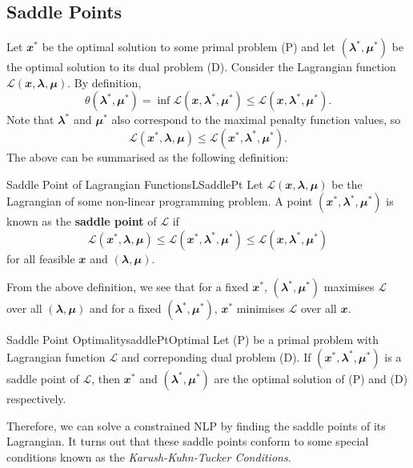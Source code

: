 \documentclass[math, code]{amznotes}
\theoremstyle{remark}
\begin{document}
\subsection{Saddle Points}
Let $\mathbfit{x}^*$ be the optimal solution to some primal problem (P) and let $(\mathbfit{\lambda}^*, \mathbfit{\mu}^*)$ be the optimal solution to its dual problem (D). Consider the Lagrangian function $\mathcal{L}(\mathbfit{x}, \mathbfit{\lambda}, \mathbfit{\mu})$. By definition, 
\begin{equation*}
    \theta(\mathbfit{\lambda}^*, \mathbfit{\mu}^*) = \inf \mathcal{L}(\mathbfit{x}, \mathbfit{\lambda}^*, \mathbfit{\mu}^*) \leq \mathcal{L}(\mathbfit{x}, \mathbfit{\lambda}^*, \mathbfit{\mu}^*).
\end{equation*}
Note that $\mathbfit{\lambda}^*$ and $\mathbfit{\mu}^*$ also correspond to the maximal penalty function values, so 
\begin{equation*}
    \mathcal{L}(\mathbfit{x}^*, \mathbfit{\lambda}, \mathbfit{\mu}) \leq \mathcal{L}(\mathbfit{x}^*, \mathbfit{\lambda}^*, \mathbfit{\mu}^*).
\end{equation*}
The above can be summarised as the following definition:
\begin{dfnbox}{Saddle Point of Lagrangian Functions}{LSaddlePt}
    Let $\mathcal{L}(\mathbfit{x}, \mathbfit{\lambda}, \mathbfit{\mu})$ be the Lagrangian of some non-linear programming problem. A point $(\mathbfit{x}^*, \mathbfit{\lambda}^*, \mathbfit{\mu}^*)$ is known as the {\color{red} \textbf{saddle point}} of $\mathcal{L}$ if
    \begin{equation*}
        \mathcal{L}(\mathbfit{x}^*, \mathbfit{\lambda}, \mathbfit{\mu}) \leq \mathcal{L}(\mathbfit{x}^*, \mathbfit{\lambda}^*, \mathbfit{\mu}^*) \leq \mathcal{L}(\mathbfit{x}, \mathbfit{\lambda}^*, \mathbfit{\mu}^*)
    \end{equation*}
    for all feasible $\mathbfit{x}$ and $(\mathbfit{\lambda}, \mathbfit{\mu})$.
\end{dfnbox}
From the above definition, we see that for a fixed $\mathbfit{x}^*$, $(\mathbfit{\lambda}^*, \mathbfit{\mu}^*)$ maximises $\mathcal{L}$ over all $(\mathbfit{\lambda}, \mathbfit{\mu})$ and for a fixed $(\mathbfit{\lambda}^*, \mathbfit{\mu}^*)$, $\mathbfit{x}^*$ minimises $\mathcal{L}$ over all $\mathbfit{x}$.
\begin{thmbox}{Saddle Point Optimality}{saddlePtOptimal}
    Let (P) be a primal problem with Lagrangian function $\mathcal{L}$ and correponding dual problem (D). If $(\mathbfit{x}^*, \mathbfit{\lambda}^*, \mathbfit{\mu}^*)$ is a saddle point of $\mathcal{L}$, then $\mathbfit{x}^*$ and $(\mathbfit{\lambda}^*, \mathbfit{\mu}^*)$ are the optimal solution of (P) and (D) respectively.
\end{thmbox}
Therefore, we can solve a constrained NLP by finding the saddle points of its Lagrangian. It turns out that these saddle points conform to some special conditions known as the \textit{Karush-Kuhn-Tucker Conditions}.
\end{document}
